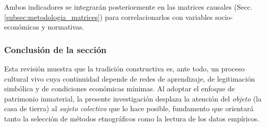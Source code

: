 Ambos indicadores se integrarán posteriormente en las matrices causales
(Secc.\,\ref{subsec:metodologia_matrices}) para correlacionarlos con
variables socio-económicas y normativas.

\subsubsection{Conclusión de la sección}

Esta revisión muestra que la tradición constructiva es,
ante todo, un proceso cultural vivo cuya continuidad depende de redes de
aprendizaje, de legitimación simbólica y de condiciones económicas
mínimas.  Al adoptar el enfoque de patrimonio inmaterial, la presente
investigación desplaza la atención del \emph{objeto} (la casa de tierra)
al \emph{sujeto colectivo} que lo hace posible, fundamento que
orientará tanto la selección de métodos etnográficos como la lectura de
los datos empíricos.
